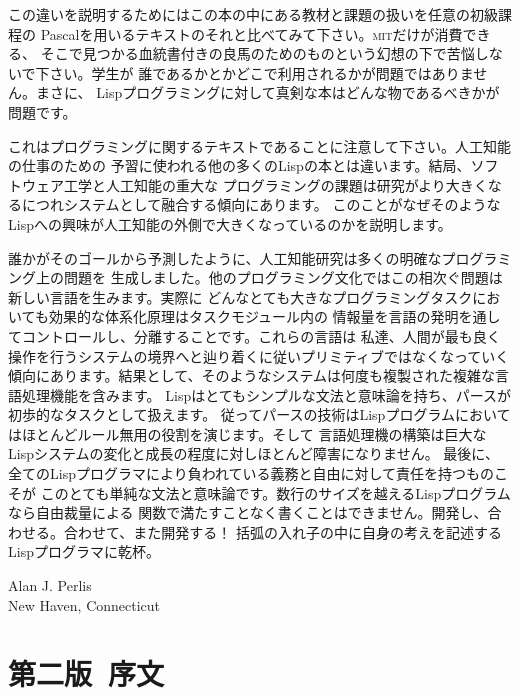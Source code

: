 \documentclass[oneside]{book}
\newcommand{\acronym}[1]{\textsc{\MakeLowercase{#1}}}
\begin{document}
この違いを説明するためにはこの本の中にある教材と課題の扱いを任意の初級課程の
Pascalを用いるテキストのそれと比べてみて下さい。\acronym{MIT}だけが消費できる、
そこで見つかる血統書付きの良馬のためのものという幻想の下で苦悩しないで下さい。学生が
誰であるかとかどこで利用されるかが問題ではありません。まさに、
Lispプログラミングに対して真剣な本はどんな物であるべきかが問題です。



これはプログラミングに関するテキストであることに注意して下さい。人工知能の仕事のための
予習に使われる他の多くのLispの本とは違います。結局、ソフトウェア工学と人工知能の重大な
プログラミングの課題は研究がより大きくなるにつれシステムとして融合する傾向にあります。
このことがなぜそのようなLispへの興味が人工知能の外側で大きくなっているのかを説明します。



誰かがそのゴールから予測したように、人工知能研究は多くの明確なプログラミング上の問題を
生成しました。他のプログラミング文化ではこの相次ぐ問題は新しい言語を生みます。実際に
どんなとても大きなプログラミングタスクにおいても効果的な体系化原理はタスクモジュール内の
情報量を言語の発明を通してコントロールし、分離することです。これらの言語は
私達、人間が最も良く操作を行うシステムの境界へと辿り着くに従いプリミティブではなくなっていく
傾向にあります。結果として、そのようなシステムは何度も複製された複雑な言語処理機能を含みます。
Lispはとてもシンプルな文法と意味論を持ち、パースが初歩的なタスクとして扱えます。
従ってパースの技術はLispプログラムにおいてはほとんどルール無用の役割を演じます。そして
言語処理機の構築は巨大なLispシステムの変化と成長の程度に対しほとんど障害になりません。
最後に、全てのLispプログラマにより負われている義務と自由に対して責任を持つものこそが
このとても単純な文法と意味論です。数行のサイズを越えるLispプログラムなら自由裁量による
関数で満たすことなく書くことはできません。開発し、合わせる。合わせて、また開発する！
括弧の入れ子の中に自身の考えを記述するLispプログラマに乾杯。

\vspace{0.5em}
\noindent
Alan J. Perlis\\
New Haven, Connecticut



\chapter*{第二版~序文}
\label{Preface}
\end{document}
